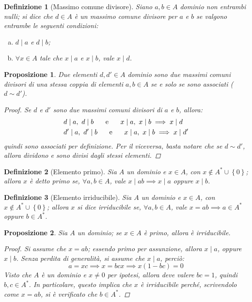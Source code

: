 \documentclass[12pt]{scrartcl}
\theoremstyle{style}
\newtheorem{definizione}{Definizione}[section]
\newtheorem{prop}{Proposizione}[section]
\numberwithin{equation}{subsection}
\begin{document}
\begin{definizione}
	[Massimo comune divisore]
	Siano $a,b \in A$ dominio non entrambi nulli; si dice che $d \in A$ \`e un \textit{massimo comune divisore} per $a$ e $b$ se valgono entrambe le seguenti condizioni:
	\begin{enumerate}[(a).]
		\item $d  \mid a$ e $d \mid b$;
		\item $\forall x \in A$ tale che $x \mid a$ e $x \mid b$, vale $x \mid d$.
	\end{enumerate}
\end{definizione}
\begin{prop}
	Due elementi $d,d' \in A$ dominio sono due massimi comuni divisori di una stessa coppia di elementi $a,b\in A$ se e solo se sono associati ($d \sim d'$).
	\begin{proof}
		Se $d$ e $d'$ sono due massimi comuni divisori di $a$ e $b$, allora:
		\[
		\begin{split}
			&d \mid a, \ d  \mid b \hspace{.5cm} \text{ e } \hspace{.5cm} x \mid a, \ x  \mid b \implies x \mid d\\
			&d' \mid a, \ d'  \mid b \hspace{.5cm} \text{ e } \hspace{.5cm} x \mid a, \ x  \mid b \implies x \mid d'
		\end{split}
		\] 
		quindi sono associati per definizione.
		Per il viceversa, basta notare che se $d \sim d'$, allora dividono e sono divisi dagli stessi elementi.
	\end{proof}
\end{prop}
\begin{definizione}
	[Elemento primo]	
	Sia $A$ un dominio e $x \in A$, con $x \not \in A^* \cup \left\{ 0 \right\} $; allora $x$ \`e detto \textit{primo} se, $\forall a,b\in A$, vale $x  \mid ab \implies x  \mid a$ oppure $x \mid b$.
\end{definizione}
\begin{definizione}
	[Elemento irriducibile]
	Sia $A$ un dominio e $x \in A$, con $x \not \in A^* \cup \left\{ 0 \right\} $; allora $x$ si dice \textit{irriducibile} se, $\forall a,b \in A$, vale $x = ab\implies a \in A^*$ oppure $b \in A^*$.
\end{definizione}
\begin{prop}\label{pimpp}
	Sia $A$ un dominio; se $x \in A$ \`e primo, allora \`e irriducibile.
	\begin{proof}
	Si assume che $x = ab$; essendo primo per assunzione, allora $x \mid a$, oppure $x  \mid b$.
	Senza perdita di generalit\`a, si assume che $x  \mid a$, perci\`o:
	\[
	a = xc \implies x= bcx\implies x(1-bc) = 0
	\] 
	Visto che $A$ \`e un dominio e $x \neq 0$ per ipotesi, allora deve valere $bc = 1$, quindi $b,c \in A^*$.
	In particolare, questo implica che $x$ \`e irriducibile perch\'e, scrivendolo come $x = ab$, si \`e verificato che $b \in A^*$.
	\end{proof}
\end{prop}
\end{document}
